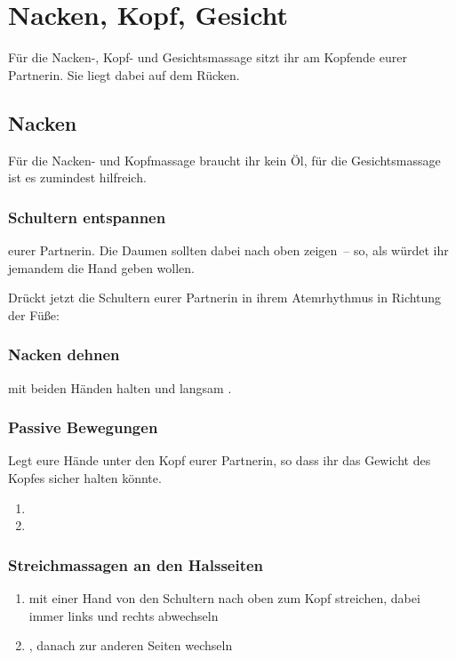\section{Nacken, Kopf, Gesicht}

Für die Nacken-, Kopf- und Gesichtsmassage sitzt ihr am Kopfende eurer Partnerin. Sie liegt dabei auf dem Rücken.

\subsection{Nacken}

Für die Nacken- und Kopfmassage braucht ihr kein Öl, für die Gesichtsmassage ist es zumindest hilfreich.

\subsubsection{Schultern entspannen}
 eurer Partnerin. Die Daumen sollten dabei nach oben zeigen~-- so, als würdet ihr jemandem die Hand geben wollen.

Drückt jetzt die Schultern eurer Partnerin in ihrem Atemrhythmus in Richtung der Füße: 

\subsubsection{Nacken dehnen}
 mit beiden Händen halten und langsam .

\subsubsection{Passive Bewegungen}

Legt eure Hände unter den Kopf eurer Partnerin, so dass ihr das Gewicht des Kopfes sicher halten könnte.

\begin{enumerate}
	\item {}
	\item {}
\end{enumerate}


\subsubsection{Streichmassagen an den Halsseiten}

\begin{enumerate}
	\item {} mit einer Hand von den Schultern nach oben zum Kopf streichen, dabei immer links und rechts abwechseln
	\item {}, danach zur anderen Seiten wechseln
\end{enumerate}


